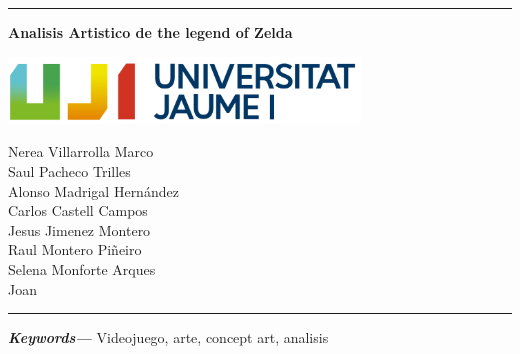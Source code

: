 \documentclass[12pt]{article}
\date{}
\providecommand{\keywords}[1]
{
  \small
  \textbf{\textit{Keywords---}} #1
}
\begin{document}
    \begin{titlepage}

        \centering
        \hrule
        \vspace{1cm}
        {\bfseries\huge Analisis Artistico de the legend of Zelda \par}
        \vspace{3cm}
        {\includegraphics[width=0.7\textwidth]{images/UJI_logo.jpg} \par}
        \vspace{4cm}

        {\large
        Nerea Villarrolla Marco \\
        Saul Pacheco Trilles \\
        Alonso Madrigal Hernández \\
        Carlos Castell Campos \\
        Jesus Jimenez Montero \\
        Raul Montero Piñeiro \\
        Selena Monforte Arques \\
        Joan \\
        \par}
        \vspace{10cm}
        \hrule

    \end{titlepage}

\newpage
\begin{abstract}
    En el siguiente documento hablaremos sobre las bases artisticas del videojuego "The Legend Of Zelda: Breath of the wild". Tanto del director de concept art como un atisbo de información sobre el juego. Finalemnete acabaremos con el analisis artistico profundo de varios fan arts.

\end{abstract}

\keywords{Videojuego, arte, concept art, analisis}

\newpage
\tableofcontents
\setcounter{tocdepth}{4}
\end{document}
